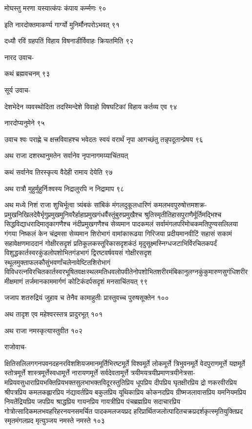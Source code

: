 मोघस्तु मरणा यस्यात्कंपः कंपाय कर्म्मणः ९०

इति नारदोक्तमाकर्ण्य गार्ग्यो मुनिर्मौनपरोऽभवत् ९१

दध्यौ रविं ग्रहपतिं विहाय विषनाडीर्विवाहः क्रियतमिति ९२

नारद उवाच-

कथं ब्रह्मवचनम् ९३

सूर्य उवाच-

देशभेदेन व्यवस्थोदिता तदस्मिन्देशे विवाहो विषघटिकां विहाय कर्तव्य एव ९४

नारदोप्यनुमेने ९५

उवाच श्वः पराह्णे च क्षत्त्रविवाहश्च भवेदतः स्वयं वरार्थं नृपा आगच्छंतु तन्नृपदूतान्प्रेषय ९६

अथ राजा दशरथानुमतेन सर्वानेव नृपानागमय्याचिंतयत्

कथं सर्वानेव तिरस्कृत्य वैदेही रामाय देयेति ९७

अथ रात्रौ मुहुर्मुहुर्निःश्वस्य निद्रालुरपि न निद्रामाप ९८

अथ मध्ये निशं राजा शुचिर्भूत्वा त्र्यंबकं सांबिकं मंगलदुकूलधारिणं
कमलभवपुरुषोत्तमशक्र-प्रमुखनिखिलदेवैर्भृगुप्रमुखमुनिवरैर्हाहाप्रमुखगंधर्वैस्तुंबुरुप्रमुखैश्च
श्रुतिस्मृतीतिहासपुराणैर्मूर्तिमद्भिश्च सिद्धविद्याधरादिमातृकागणैश्च नंदीप्रमुखगणैश्च सेव्यमान
पादकमलं सर्वामंगलपरिमोचकमतिपुण्यसलिलया गंगया निष्कलं केन चंद्रमसा सेव्यमान शिरोभागं
वामांकारूढया गिरिजया प्रदीयमानवीटिं सहासं सकामं सहावेक्षणमाददानं गोक्षीरसदृशं
प्रतिकूलकस्तूरिकासदृशकंठं मृदुसूक्ष्मस्निग्धजटाभिर्विरचितकपर्दं
विशुद्धकार्तस्वरकुंडलोपशोभितगंडभागं द्विरष्टवर्षवयसं गोक्षीरसदृश
स्थूलमुक्ताफलकौसुंभवर्णांचलेनावेष्टितशिरोभागं
विविधरत्नविरचितकार्तस्वरभूषितवक्षःस्थलमतिधवलोपवीतेनोपशोभितशरीरमंबिकानुलग्नकुंकुमारुणसुगंधिशरीरमीक्षमाणं
तर्जमानकाममार्गणं कोटिकंदर्पसदृशं मनसाचिंतयत् ९९

जजाप शतरुद्रियं जुहाव च तेनैव कामाहुतीः प्रास्तुवच्च पुरुषसूक्तेन १००

अथ तादृश एव महेश्वरस्तत्र प्रादुरभूत् १०१

अथ राजा नमस्कृत्यास्तुवीत १०२

राजोवाच-

क्षितिसलिलगगनपवनदहनरविशशियजमानमूर्तिभिरष्टमूर्ते विश्वमूर्ते लोकमूर्त्ते त्रिभुवनमूर्ते
वेदपुराणमूर्त्ते यज्ञमूर्ते स्तोत्रमूर्त्ते शास्त्रमूर्त्तेस्वधामूर्त्ते नारायणमूर्त्ते सर्वदेवतामूर्त्ते
त्रयीमयत्रयीप्रमाणत्रयीनेत्रसा-मप्रियवसुधाराप्रियभक्तिप्रियभक्तसुलभाभक्तविदूरस्तुतिप्रिय
धूपप्रिय दीपप्रिय घृतक्षीरप्रिय द्रो णकरवीरप्रिय श्रीपत्रप्रिय कमलकह्लारप्रिय
नंद्यावर्तप्रिय बकुलप्रिय यूथिकाप्रिय कोकनदप्रिय ग्रीष्मजलावासप्रिय यमनियमप्रिय
नियतेंद्रियप्रिय जपप्रिय श्राद्धप्रिय गायनप्रिय गायत्रीप्रिय पंचब्रह्मप्रिय सदाचारप्रिय
गोत्रोत्सादिकमलभवहरिहरनयनसमर्चित पादकमलजयप्रद
हरिप्रार्थितजलोत्पादितचक्रप्रदर्शकृत्स्मृतियुक्तिप्रद स्मृतमंगलप्रद मृत्युञ्जय नमस्ते नमस्ते १०३


